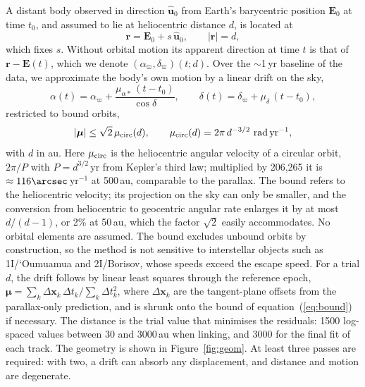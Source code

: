 \documentclass[twocolumn,linenumbers]{aastex702}
\begin{document}
A distant body observed in direction $\hat{\mathbf{u}}_0$ from Earth's barycentric position $\mathbf{E}_0$ at time $t_0$, and assumed to lie at heliocentric distance $d$, is located at
\begin{equation}
\mathbf{r} = \mathbf{E}_0 + s\,\hat{\mathbf{u}}_0, \qquad |\mathbf{r}| = d,
\end{equation}
which fixes $s$. Without orbital motion its apparent direction at time $t$ is that of $\mathbf{r} - \mathbf{E}(t)$, which we denote $(\alpha_\varpi, \delta_\varpi)(t; d)$. Over the $\sim$1\,yr baseline of the data, we approximate the body's own motion by a linear drift on the sky,
\begin{equation}
\alpha (t) = \alpha_\varpi + \frac{\mu_{\alpha*}\,(t - t_0)}{\cos\delta}, \qquad \delta(t) = \delta_\varpi + \mu_\delta\,(t - t_0),
\label{eq:drift}
\end{equation}
restricted to bound orbits,
\begin{equation}
|\boldsymbol{\mu}| \le \sqrt{2}\,\mu_{\rm circ}(d), \qquad \mu_{\rm circ}(d) = 2\pi\,d^{-3/2}\ \mathrm{rad\,yr^{-1}},
\label{eq:bound}
\end{equation}
with $d$ in au. Here $\mu_{\rm circ}$ is the heliocentric angular velocity of a circular orbit, $2\pi/P$ with $P = d^{3/2}$\,yr from Kepler's third law; multiplied by 206{,}265 it is $\approx 116\arcsec$\,yr$^{-1}$ at 500\,au, comparable to the parallax. The bound refers to the heliocentric velocity; its projection on the sky can only be smaller, and the conversion from heliocentric to geocentric angular rate enlarges it by at most $d/(d-1)$, or 2\% at 50\,au, which the factor $\sqrt{2}$ easily accommodates. No orbital elements are assumed. The bound excludes unbound orbits by construction, so the method is not sensitive to interstellar objects such as 1I/`Oumuamua and 2I/Borisov, whose speeds exceed the escape speed. For a trial $d$, the drift follows by linear least squares through the reference epoch, $\boldsymbol{\mu} = \sum_k \Delta\mathbf{x}_k\,\Delta t_k / \sum_k \Delta t_k^2$, where $\Delta\mathbf{x}_k$ are the tangent-plane offsets from the parallax-only prediction, and is shrunk onto the bound of equation~(\ref{eq:bound}) if necessary. The distance is the trial value that minimises the residuals: 1500 log-spaced values between 30 and 3000\,au when linking, and 3000 for the final fit of each track. The geometry is shown in Figure~\ref{fig:geom}. At least three passes are required: with two, a drift can absorb any displacement, and distance and motion are degenerate.
\end{document}
